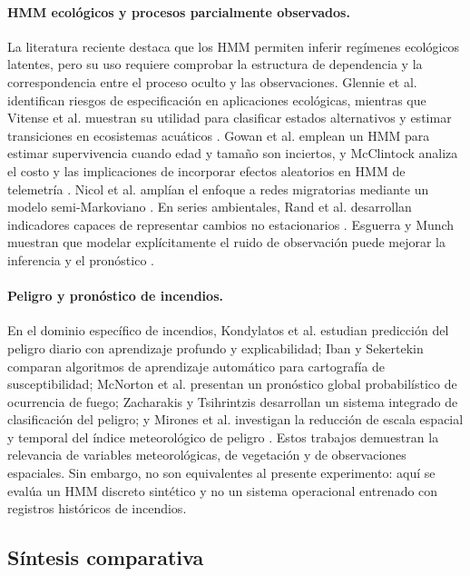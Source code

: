 \documentclass[11pt,letterpaper]{article}
\begin{document}
\paragraph{HMM ecológicos y procesos parcialmente observados.}
La literatura reciente destaca que los HMM permiten inferir regímenes ecológicos latentes, pero su uso requiere comprobar la estructura de dependencia y la correspondencia entre el proceso oculto y las observaciones. Glennie et al. identifican riesgos de especificación en aplicaciones ecológicas, mientras que Vitense et al. muestran su utilidad para clasificar estados alternativos y estimar transiciones en ecosistemas acuáticos \cite{glennie2022,vitense2021}. Gowan et al. emplean un HMM para estimar supervivencia cuando edad y tamaño son inciertos, y McClintock analiza el costo y las implicaciones de incorporar efectos aleatorios en HMM de telemetría \cite{gowan2021,mcclintock2021}. Nicol et al. amplían el enfoque a redes migratorias mediante un modelo semi-Markoviano \cite{nicol2023}. En series ambientales, Rand et al. desarrollan indicadores capaces de representar cambios no estacionarios \cite{rand2024}. Esguerra y Munch muestran que modelar explícitamente el ruido de observación puede mejorar la inferencia y el pronóstico \cite{esguerra2024}.

\paragraph{Peligro y pronóstico de incendios.}
En el dominio específico de incendios, Kondylatos et al. estudian predicción del peligro diario con aprendizaje profundo y explicabilidad; Iban y Sekertekin comparan algoritmos de aprendizaje automático para cartografía de susceptibilidad; McNorton et al. presentan un pronóstico global probabilístico de ocurrencia de fuego; Zacharakis y Tsihrintzis desarrollan un sistema integrado de clasificación del peligro; y Mirones et al. investigan la reducción de escala espacial y temporal del índice meteorológico de peligro \cite{kondylatos2022,iban2022,mcnorton2024,zacharakis2025,mirones2025}. Estos trabajos demuestran la relevancia de variables meteorológicas, de vegetación y de observaciones espaciales. Sin embargo, no son equivalentes al presente experimento: aquí se evalúa un HMM discreto sintético y no un sistema operacional entrenado con registros históricos de incendios.

\subsection{Síntesis comparativa}
\end{document}
